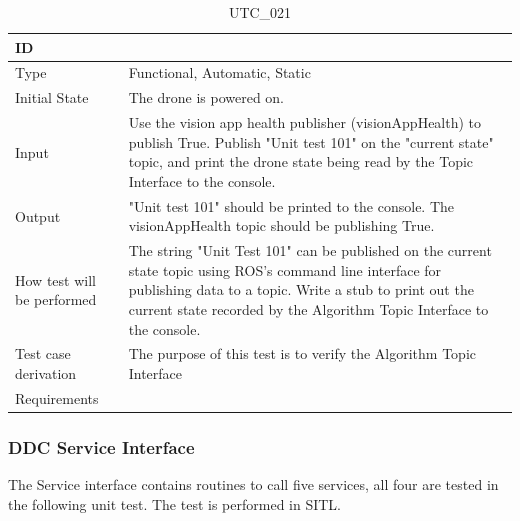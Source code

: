 \documentclass[12pt, titlepage]{article}
\begin{document}
\begin{table}[!h]
\begin{center}
\caption {UTC\_021}
\label{tab:UTC_021}
\begin{tabular}{ | m{3.2cm} | m{12.2cm} | } 
\hline
ID & \nameref{tab:UTC_021} \\ 
\hline
Type &  Functional, Automatic, Static  \\ 
\hline
Initial State & The drone is powered on. \\ 
\hline
Input & Use the vision app health publisher (visionAppHealth) to publish True. Publish "Unit test 101" on the "current state" topic, and print the drone state being read by the Topic Interface to the console. \\ 
\hline
Output &  "Unit test 101" should be printed to the console. The visionAppHealth topic should be publishing True. \\ 
\hline
How test will be performed & The string "Unit Test 101" can be published on the current state topic using ROS's command line interface for publishing data to a topic.
Write a stub to print out the current state recorded by the Algorithm Topic Interface to the console.  \\ 
\hline
Test case derivation & The purpose of this test is to verify the Algorithm Topic Interface \\ 
\hline
Requirements &  \\ 
\hline
\end{tabular}
\end{center}
\end{table}


\subsubsection{DDC Service Interface}

The Service interface contains routines to call five services, all four are tested in the following unit test. The test is performed in SITL.
\end{document}
